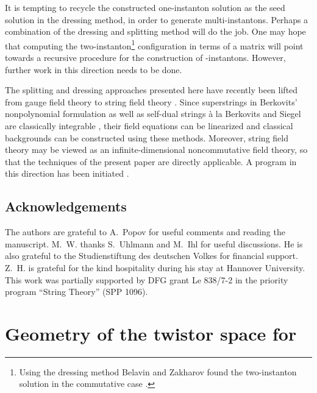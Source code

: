 \documentclass[a4paper,11pt,english]{article}
\numberwithin{equation}{section}
\renewcommand{\=}{\ =\ }
\begin{document}
It is tempting to recycle the constructed one-instanton solution as the seed 
solution in the dressing method, in order to generate multi-instantons. 
Perhaps a combination of the dressing and splitting method will do the job. 
One may hope that computing the two-instanton\footnote{
Using the dressing method Belavin and Zakharov found the two-instanton 
solution in the commutative case \cite{Belavin:cz}.} 
configuration in terms of a matrix \coordHE{} will point towards a 
recursive procedure for the construction of \coordHE{}-instantons. 
However, further work in this direction needs to be done.

The splitting and dressing approaches presented here have recently been
lifted from gauge field theory to string field theory 
\cite{Lechtenfeld:2002cu,Kling:2002ht}.
Since \coordHE{} superstrings in Berkovits' nonpolynomial formulation 
\cite{Berkovits:1995ab} 
as well as \coordHE{} self-dual strings \`a la Berkovits and Siegel
\cite{Berkovits:1997pq}
are classically integrable \cite{Lechtenfeld:2000qj},
their field equations can be linearized and classical backgrounds
can be constructed using these methods. 
Moreover, string field theory may be viewed as an infinite-dimensional
noncommutative field theory, so that the techniques of the present paper
are directly applicable. A program in this direction has been initiated
\cite{Lechtenfeld:2002cu,Kling:2002ht}.


\subsection*{Acknowledgements}

The authors are grateful to A.~Popov for useful comments and reading the 
manuscript. M.~W. thanks S.~Uhlmann and M.~Ihl for useful discussions. 
He is also grateful to the Studienstiftung des deutschen Volkes for
financial support. Z.~H. is grateful for the kind hospitality during his stay 
at Hannover University. This work was partially supported by DFG grant 
Le 838/7-2 in the priority program ``String Theory'' (SPP 1096).


\setcounter{section}{0}
\renewcommand{\thesection}{\Alph{section}}
\section{Geometry of the twistor space for \coordHE{}}
\end{document}
